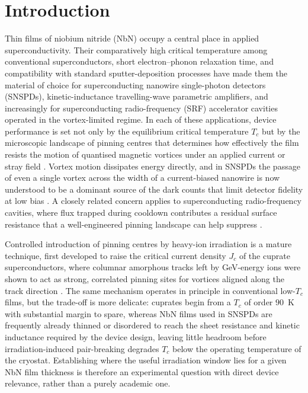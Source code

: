 \section{Introduction}
\label{sec:intro}

Thin films of niobium nitride (NbN) occupy a central place in applied superconductivity. Their comparatively high critical temperature among conventional superconductors, short electron--phonon relaxation time, and compatibility with standard sputter-deposition processes have made them the material of choice for superconducting nanowire single-photon detectors (SNSPDs), kinetic-inductance travelling-wave parametric amplifiers, and increasingly for superconducting radio-frequency (SRF) accelerator cavities operated in the vortex-limited regime. In each of these applications, device performance is set not only by the equilibrium critical temperature $T_c$ but by the microscopic landscape of pinning centres that determines how effectively the film resists the motion of quantised magnetic vortices under an applied current or stray field \cite{blatter1994}. Vortex motion dissipates energy directly, and in SNSPDs the passage of even a single vortex across the width of a current-biased nanowire is now understood to be a dominant source of the dark counts that limit detector fidelity at low bias \cite{semenov2001,ilin2000}. A closely related concern applies to superconducting radio-frequency cavities, where flux trapped during cooldown contributes a residual surface resistance that a well-engineered pinning landscape can help suppress \cite{padamsee2009}.

Controlled introduction of pinning centres by heavy-ion irradiation is a mature technique, first developed to raise the critical current density $J_c$ of the cuprate superconductors, where columnar amorphous tracks left by GeV-energy ions were shown to act as strong, correlated pinning sites for vortices aligned along the track direction \cite{civale1991}. The same mechanism operates in principle in conventional low-$T_c$ films, but the trade-off is more delicate: cuprates begin from a $T_c$ of order $90$~K with substantial margin to spare, whereas NbN films used in SNSPDs are frequently already thinned or disordered to reach the sheet resistance and kinetic inductance required by the device design, leaving little headroom before irradiation-induced pair-breaking degrades $T_c$ below the operating temperature of the cryostat. Establishing where the useful irradiation window lies for a given NbN film thickness is therefore an experimental question with direct device relevance, rather than a purely academic one.

